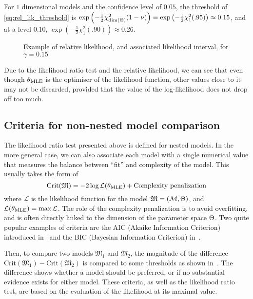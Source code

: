 \documentclass[../../Main_ManuscritThese.tex]{subfiles}
\newcommand\imgpath{/home/victor/acadwriting/Manuscrit/Text/Chapter2/img/}
\begin{document}
For $1$ dimensional models and the confidence level of $0.05$, the
threshold of \cref{eq:rel_lik_threshold} is
$\exp\left(-\frac{1}{2}\chi^2_{\mathrm{dim}(\Theta)}(1-\nu)\right) =
\exp\left(-\frac{1}{2}\chi^2_{1}(.95)\right) \approx 0.15$, and at a
level $0.10$,
$\exp\left(-\frac{1}{2}\chi^2_{1}(.90)\right) \approx 0.26$.

\begin{figure}[ht]
  \centering 
  
  \caption{\label{fig:relative_likelihood} Example of relative likelihood, and associated likelihood interval, for $\gamma=0.15$}
\end{figure}

Due to the likelihood ratio test and the relative likelihood, we can
see that even though ${\theta}_{\mathrm{MLE}}$ is the optimiser of the
likelihood function, other values close to it may not be discarded,
provided that the value of the log-likelihood does not drop off too
much.

\subsection{Criteria for non-nested model comparison}
\label{sec:criteria_AIC}
The likelihood ratio test presented above is defined for nested
models. In the more general case, we can also associate each model
with a single numerical value that measures the balance between
``fit'' and complexity of the model. This usually takes the form of
\begin{equation}
  \mathrm{Crit}(\mathfrak{M})=-2 \log \mathcal{L} ({\theta}_{\mathrm{MLE}}) + \text{Complexity penalization}
\end{equation}
where $\mathcal{L}$ is the likelihood function for the model
$\mathfrak{M} = (\mathcal{M},\Theta)$, and
$\mathcal{L}({\theta}_{\mathrm{MLE}}) = \max \mathcal{L}$. The role of the
complexity penalization is to avoid overfitting, and is often directly
linked to the dimension of the parameter space $\Theta$.  Two quite
popular examples of criteria are the AIC (Akaike Information
Criterion) introduced in~\cite{akaike_new_1974} and the BIC (Bayesian
Information Criterion) in~\cite{schwarz_estimating_1978}.

Then, to compare two models $\mathfrak{M}_1$ and $\mathfrak{M}_2$, the
magnitude of the difference
$\mathrm{Crit}(\mathfrak{M}_1) - \mathrm{Crit}(\mathfrak{M}_2)$ is
compared to some thresholds as shown
in~\cite{burnham_multimodel_2004}.  The difference shows whether a
model should be preferred, or if no substantial evidence exists for
either model.  These criteria, as well as the likelihood ratio test,
are based on the evaluation of the likelihood at its maximal value.
\end{document}
